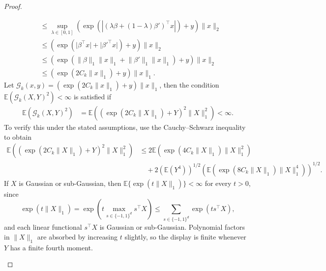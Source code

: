\documentclass[12pt]{article}
\theoremstyle{remark}
\theoremstyle{plain}
\begin{document}
\begin{proof}
\begin{enumerate}
\begin{align*}
        &\leq \sup_{\lambda\in\left[0, 1\right]}\left( \exp\left(\left\lvert(\lambda\beta + (1 - \lambda)\beta')^\top x\right\rvert\right) + y\right) \lVert x\rVert_2\\
        &\leq \left( \exp\left(\lvert\beta^\top x\rvert + \lvert\beta'^\top x\rvert\right) + y\right) \lVert x\rVert_2\\
        &\leq \left( \exp(\lVert\beta\rVert_1\lVert x\rVert_1 + \lVert\beta'\rVert_1\lVert x\rVert_1) + y\right) \lVert x\rVert_2\\
        &\leq \left( \exp(2C_k\lVert x\rVert_1) + y\right) \lVert x\rVert_1.
    \end{align*}
    Let $\mathcal{G}_k(x, y) = \left( \exp(2C_k\lVert x\rVert_1) + y\right) \lVert x\rVert_1$, then the condition $\mathbb{E}\left(\mathcal{G}_k(X, Y)^2\right) < \infty$ is satisfied if
    \begin{align}\label{Eqs: Poisson condition}
        \mathbb{E}\left(\mathcal{G}_k(X, Y)^2\right) &= \mathbb{E}\left(\left( \exp(2C_k\lVert X\rVert_1) + Y\right)^2 \lVert X\rVert_1^2\right) < \infty.
    \end{align}
    To verify this under the stated assumptions, use the Cauchy--Schwarz inequality to obtain
    \begin{align*}
        \mathbb{E}\left(\left( \exp(2C_k\lVert X\rVert_1) + Y\right)^2 \lVert X\rVert_1^2\right)
        &\leq 2\mathbb{E}\left(\exp(4C_k\lVert X\rVert_1)\lVert X\rVert_1^2\right)\\
        &\quad + 2\left(\mathbb{E}(Y^4)\right)^{1/2}\left(\mathbb{E}\left(\exp(8C_k\lVert X\rVert_1)\lVert X\rVert_1^4\right)\right)^{1/2}.
    \end{align*}
    If $X$ is Gaussian or sub-Gaussian, then $\mathbb{E}\{\exp(t\lVert X\rVert_1)\}<\infty$ for every $t>0$, since
    \[
        \exp(t\lVert X\rVert_1)=\exp\!\left(t\max_{s\in\{-1,1\}^d}s^\top X\right)\leq \sum_{s\in\{-1,1\}^d}\exp(ts^\top X),
    \]
    and each linear functional $s^\top X$ is Gaussian or sub-Gaussian. Polynomial factors in $\lVert X\rVert_1$ are absorbed by increasing $t$ slightly, so the display is finite whenever $Y$ has a finite fourth moment.
\end{enumerate}
\end{proof}
\end{document}
